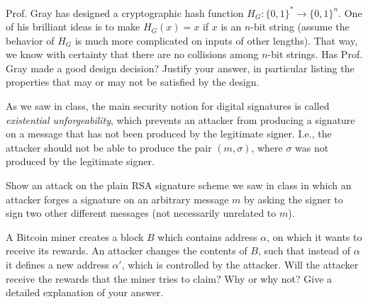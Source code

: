 \documentclass[12pt,addpoints,answers]{exam}
\begin{document}
\begin{questions}
\begin{parts}

\end{parts}

\newpage

\question[10] Prof. Gray has designed a cryptographic hash function $H_G : \{0, 1\}^\ast \rightarrow \{0, 1\}^n$. One of his brilliant ideas is to make $H_G(x) = x$ if $x$ is an $n$-bit string (assume the behavior of $H_G$ is much more complicated on inputs of other lengths). That way, we know with certainty that there are no collisions among $n$-bit strings. Has Prof. Gray made a good design decision? Justify your answer, in particular listing the properties that may or may not be satisfied by the design.

    

\newpage

\question[10] As we saw in class, the main security notion for digital signatures is called {\em existential unforgeability}, which prevents an attacker from producing a signature on a message that has not been produced by the legitimate signer. I.e., the attacker should not be able to produce the pair $(m, \sigma)$, where $\sigma$ was not produced by the legitimate signer. 

Show an attack on the plain RSA signature scheme we saw in class in which an attacker forges a signature on an arbitrary message $m$ by asking the signer to sign two other different messages (not necessarily unrelated to $m$).

    

\newpage

\question[10] A Bitcoin miner creates a block $B$ which contains address $\alpha$, on which it wants to receive its rewards. An attacker changes the contents of $B$, such that instead of $\alpha$ it defines a new address $\alpha'$, which is controlled by the attacker. Will the attacker receive the rewards that the miner tries to claim? Why or why not? Give a detailed explanation of your answer.

    

\end{questions}
\end{document}
